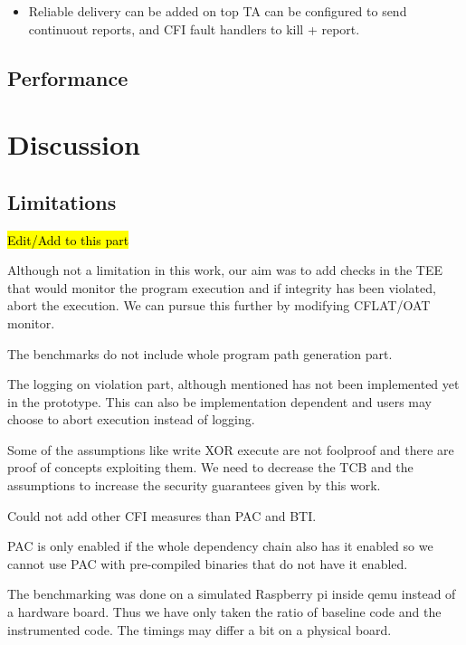 \documentclass[a4paper, nobind]{templates/ociamthesis}
\providecommand{\tightlist}{%
  \setlength{\itemsep}{0pt}\setlength{\parskip}{0pt}}
\begin{document}
\begin{itemize}
\tightlist
\item
  Reliable delivery can be added on top
  TA can be configured to send continuout reports, and CFI fault handlers to kill + report.
\end{itemize}

\section{Performance}\label{performance}

\chapter{Discussion}\label{discussion}

\minitoc 

\section{Limitations}\label{limitations-2}

\hl{Edit/Add to this part}

Although not a limitation in this work, our aim was to add checks in the TEE
that would monitor the program execution and if integrity has been violated,
abort the execution. We can pursue this further by modifying CFLAT/OAT monitor.

The benchmarks do not include whole program path generation part.

The logging on violation part, although mentioned has not been implemented yet
in the prototype. This can also be implementation dependent and users may choose
to abort execution instead of logging.

Some of the assumptions like write XOR execute are not foolproof and there are
proof of concepts exploiting them. We need to decrease the TCB and the
assumptions to increase the security guarantees given by this work.

Could not add other CFI measures than PAC and BTI.

PAC is only enabled if the whole dependency chain also has it enabled so we
cannot use PAC with pre-compiled binaries that do not have it enabled.

The benchmarking was done on a simulated Raspberry pi inside qemu instead of a
hardware board. Thus we have only taken the ratio of baseline code and the
instrumented code. The timings may differ a bit on a physical board.
\end{document}
